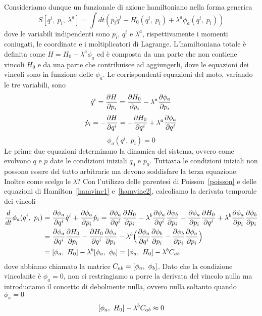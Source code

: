     Consideriamo dunque un funzionale di azione hamiltoniano nella forma generica
    \begin{equation} \label{azionevincolo}
        S[q^i,~p_i,~\lambda^a] = \int dt (p_i \dot q^i - H_0(q^i, ~p_i) + \lambda^a \phi_a (q^i, ~p_i))
    \end{equation}
    dove le variabili indipendenti sono $p_i$, $q^i$ e $\lambda^a$, rispettivamente i momenti coniugati, le coordinate e i moltiplicatori di Lagrange. L'hamiltoniana totale è definita come $H = H_0 - \lambda^a \phi_a$ ed è composta da una parte che non contiene vincoli $H_0$ e da una parte che contribuisce ad aggiungerli, dove le equazioni dei vincoli sono in funzione delle $\phi_a$. Le corrispondenti equazioni del moto, variando le tre variabili, sono
    \begin{equation} \label{hamvinc1}
        \dot q^i = \frac{\partial H}{\partial p_i} = \frac{\partial H_0}{\partial p_i} - \lambda^a \frac{\partial\phi_a}{\partial p_i}
    \end{equation}
    \begin{equation} \label{hamvinc2}
        \dot p_i = - \frac{\partial H}{\partial q^i} = - \frac{\partial H_0}{\partial q^i} + \lambda^a \frac{\partial\phi_a}{\partial q^i}
    \end{equation} 
    \begin{equation} \label{hamvinc3}
        \phi_a(q^i, ~p_i) = 0
    \end{equation}
    Le prime due equazioni determinano la dinamica del sistema, ovvero come evolvono $q$ e $p$ date le condizioni iniziali $q_0$ e $p_0$. Tuttavia le condizioni iniziali non possono essere del tutto arbitrarie ma devono soddisfare la terza equazione. Inoltre come scelgo le $\lambda$? Con l'utilizzo delle parentesi di Poisson~\eqref{poisson} e delle equazioni di Hamilton~\eqref{hamvinc1} e~\eqref{hamvinc2}, calcoliamo la derivata temporale dei vincoli 
    \begin{equation} \label{dervinc}
    \begin{aligned}
        \frac{d}{dt} \phi_a(q^i, ~p_i) & = \frac{\partial\phi_a}{\partial q^i} \dot q^i + \frac{\partial\phi_a}{\partial p_i} \dot p_i = \frac{\partial\phi_a}{\partial q^i} \frac{\partial H_0}{\partial p_i} - \lambda^b \frac{\partial\phi_a}{\partial q^i} \frac{\partial\phi_b}{\partial p_i} - \frac{\partial\phi_a}{\partial p_i} \frac{\partial H_0}{\partial q^i} + \lambda^b \frac{\partial\phi_a}{\partial p_i} \frac{\partial\phi_b}{\partial p_i} \\ & = \frac{\partial\phi_a}{\partial q^i} \frac{\partial H_0}{\partial p_i} - \frac{\partial H_0}{\partial q^i} \frac{\partial\phi_a}{\partial p_i} - \lambda^b \Big ( \frac{\partial\phi_a}{\partial q^i} \frac{\partial\phi_b}{\partial p_i} -  \frac{\partial\phi_b}{\partial p_i} \frac{\partial\phi_a}{\partial p_i} \Big) \\ & = [\phi_a, ~H_0] - \lambda^b [\phi_a, ~\phi_b] = [\phi_a, ~H_0] - \lambda^b C_{ab}
    \end{aligned}
    \end{equation}
    dove abbiamo chiamato la matrice $C_{ab} = [\phi_a, ~\phi_b]$. Dato che la condizione vincolante è $\phi_a = 0$, non ci restringiamo a porre la derivata del vincolo nulla ma introduciamo il concetto di debolmente nulla, ovvero nulla soltanto quando $\phi_a = 0$
    \begin{equation} \label{vincoli}
        [\phi_a, ~H_0] - \lambda^b C_{ab} \approx 0
    \end{equation}


